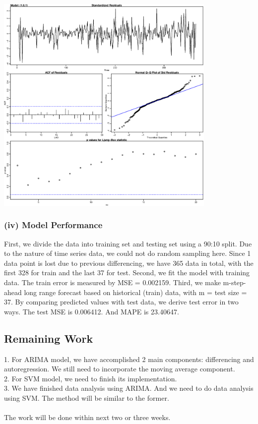 \documentclass[11pt,a4paper]{article}
\begin{document}
\begin{center}
   \includegraphics[width=0.8\textwidth]{diagnosis.eps}
\end{center}
\graphicspath{{./Figures/}}


\subsubsection*{(iv) Model Performance}

First, we divide the data into training set and testing set using a 90:10 split. Due to the nature of time series data, we could not do random sampling here. Since 1 data point is lost due to previous differencing, we have 365 data in total, with the first 328 for train and the last 37 for test. Second, we fit the model with training data. The train error is measured by MSE = 0.002159. Third, we make m-step-ahead long range forecast based on historical (train) data, with m = test size = 37. By comparing predicted values with test data, we derive test error in two ways. The test MSE is 0.006412. And MAPE is 23.40647.


\subsection*{Remaining Work}
1. For ARIMA model, we have accomplished 2 main components: differencing and autoregression. We still need to incorporate the moving average component.  \\
2. For SVM model, we need to finish its implementation. \\
3. We have finished data analysis using ARIMA. And we need to do data analysis using SVM. The method will be similar to the former. \\
\\ The work will be done within next two or three weeks.
\end{document}
